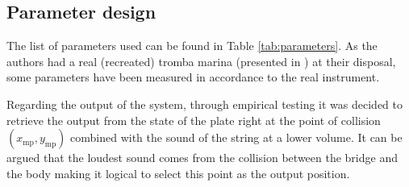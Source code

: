 \documentclass[dvipsnames, pdftex]{article}
\begin{document}
\subsection{Parameter design}
The list of parameters used can be found in Table \ref{tab:parameters}. As the authors had a real (recreated) tromba marina (presented in \cite{Baldwin2016:SMC2020}) at their disposal, some parameters have been measured in accordance to the real instrument.

Regarding the output of the system, through empirical testing it was decided to retrieve the output from the state of the plate right at the point of collision $(x_\text{mp},y_\text{mp})$ combined with the sound of the string at a lower volume. It can be argued that the loudest sound comes from the collision between the bridge and the body making it logical to select this point as the output position. 
\end{document}
